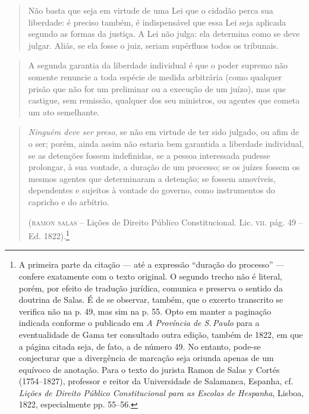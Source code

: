 \begin{quote}
Não basta que seja em virtude de uma Lei que o cidadão perca sua
liberdade: é preciso também, é indispensável que essa Lei seja
aplicada segundo as formas da justiça. A Lei não julga: ela determina
como se deve julgar. Aliás, se ela fosse o juiz, seriam supérfluos
todos os tribunais.
\end{quote}

\begin{quote}
A segunda garantia da liberdade individual é que o poder supremo não
somente renuncie a toda espécie de medida arbitrária (como qualquer
prisão que não for um preliminar ou a execução de um juízo), mas que
castigue, sem remissão, qualquer dos seu ministros, ou agentes que
cometa um ato semelhante.
\end{quote}

\begin{quote}
\emph{Ninguém deve ser preso}, se não em virtude de ter sido julgado,
ou afim de o ser; porém, ainda assim não estaria bem garantida a
liberdade individual, se as detenções fossem indefinidas, se a pessoa
interessada pudesse prolongar, à sua vontade, a duração de um processo;
se os juízes fossem os mesmos agentes que determinaram a detenção; se
fossem amovíveis, dependentes e sujeitos à vontade do governo, como
instrumentos do capricho e do arbítrio.

(\textsc{ramon salas} -- Lições de
Direito Público Constitucional. Lic. \textsc{vii}. pág. 49 -- Ed.
1822).\footnote{A primeira parte da citação --- até a expressão
  ``duração do processo'' --- confere exatamente com o texto original. O
  segundo trecho não é literal, porém, por efeito de tradução jurídica,
  comunica e preserva o sentido da doutrina de Salas. É de se observar,
  também, que o excerto transcrito se verifica não na p. 49, mas sim na
  p. 55. Opto em manter a paginação indicada conforme o publicado em
  \emph{A Província de S.\,Paulo} para a eventualidade de Gama ter
  consultado outra edição, também de 1822, em que a página citada seja,
  de fato, a de número 49. No entanto, pode-se conjecturar que a
  divergência de marcação seja oriunda apenas de um equívoco de
  anotação. Para o texto do jurista Ramon de Salas y Cortés (1754--1827),
  professor e reitor da Universidade de Salamanca, Espanha, cf.
  \emph{Lições de Direito Público Constitucional para as Escolas de
  Hespanha}, Lisboa, 1822, especialmente pp. 55--56.}
 \end{quote} 

